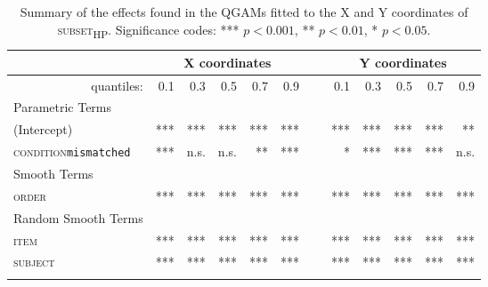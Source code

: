 \begin{table}\fontsize{9}{10}
\caption{Summary of the effects found in the QGAMs fitted to the X and Y coordinates of \textsc{subset\textsubscript{HP}}. Significance codes: *** $p < 0.001$, ** $p < 0.01$, * $p < 0.05$.}
\label{tab:8.7}
\centering
\begin{tabular}{lrrrrrrrrrrr}
\lsptoprule
~                   & \multicolumn{5}{c}{X coordinates}       & \multicolumn{1}{c}{}                       & \multicolumn{5}{c}{Y coordinates}                               \\
\midrule
\multicolumn{1}{r}{quantiles:}          & 0.1        & 0.3        & 0.5        & 0.7        & 0.9 & ~       & 0.1        & 0.3        & 0.5        & 0.7        & 0.9         \\
\midrule
Parametric Terms    & \textbf{~} & \textbf{~} & \textbf{~} & \textbf{~} & \textbf{~} & \textbf{~} & \textbf{~} & \textbf{~} & \textbf{~} & \textbf{~}  \\
\midrule
(Intercept)         & ***        & ***        & ***        & ***        & *** & ~       & ***        & ***        & ***        & ***        & **          \\
\textsc{condition}\texttt{mismatched} & ***       & n.s.          & n.s.        & **        & ***  & ~      & *       & ***        & ***        & ***        & n.s.         \\
\midrule
Smooth Terms        & \textbf{~} & \textbf{~} & \textbf{~} & \textbf{~} & \textbf{~} & \textbf{~} & \textbf{~} & \textbf{~} & \textbf{~} & \textbf{~}  \\
\midrule
\textsc{order}               & ***        & ***        & ***        & ***        & ***   & ~     & ***        & ***        & ***        & ***        & ***         \\
\midrule
Random Smooth Terms & \textbf{~} & \textbf{~} & \textbf{~} & \textbf{~} & \textbf{~} & \textbf{~} & \textbf{~} & \textbf{~} & \textbf{~} & \textbf{~}  \\
\midrule
\textsc{item}                & ***        & ***        & ***        & ***        & ***  & ~      & ***        & ***        & ***        & ***        & ***         \\
\textsc{subject}             & ***        & ***        & ***        & ***        & ***  & ~      & ***        & ***        & ***        & ***        & ***        \\
\lspbottomrule
\end{tabular}
\end{table}

